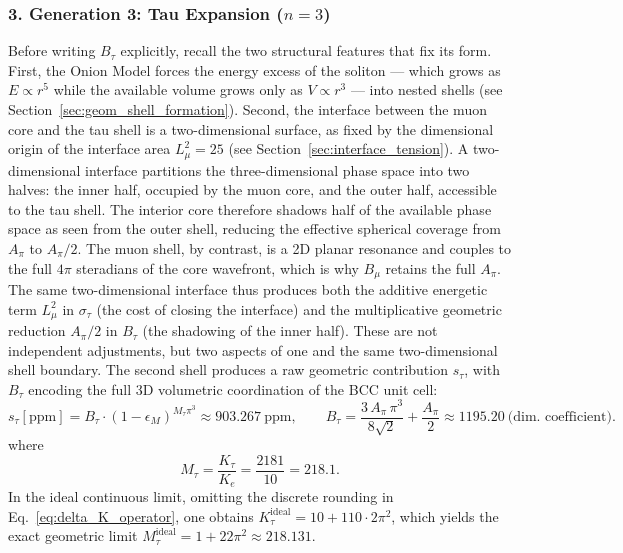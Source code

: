 \documentclass[10pt,a4paper]{article}
\begin{document}
\subsubsection*{3. Generation 3: Tau Expansion ($n=3$)}
Before writing $B_\tau$ explicitly, recall the two structural features
that fix its form. First, the Onion Model forces the energy excess of
the soliton --- which grows as $E \propto r^5$ while the available
volume grows only as $V \propto r^3$ --- into nested shells (see
Section~\ref{sec:geom_shell_formation}). Second, the interface between
the muon core and the tau shell is a two-dimensional surface, as fixed
by the dimensional origin of the interface area $L_\mu^2 = 25$ (see
Section~\ref{sec:interface_tension}). A two-dimensional interface
partitions the three-dimensional phase space into two halves: the inner
half, occupied by the muon core, and the outer half, accessible to the
tau shell. The interior core therefore shadows half of the available
phase space as seen from the outer shell, reducing the effective
spherical coverage from $A_\pi$ to $A_\pi/2$. The muon shell, by
contrast, is a 2D planar resonance and couples to the full $4\pi$
steradians of the core wavefront, which is why $B_\mu$ retains the full
$A_\pi$. The same two-dimensional interface thus produces both the
additive energetic term $L_\mu^2$ in $\sigma_\tau$ (the cost of closing
the interface) and the multiplicative geometric reduction $A_\pi/2$ in
$B_\tau$ (the shadowing of the inner half). These are not independent
adjustments, but two aspects of one and the same two-dimensional shell
boundary.
The second shell produces a raw geometric contribution $s_\tau$, with $B_\tau$
encoding the full 3D volumetric coordination of the BCC unit cell:
\begin{equation}
	s_{\tau}[\text{ppm}]
	= B_{\tau}\cdot(1-\epsilon_M)^{M_{\tau}\pi^{3}}
	\approx 903.267\ \text{ppm},
	\qquad
	B_{\tau} = \frac{3\,A_{\pi}\,\pi^{3}}{8\sqrt{2}} + \frac{A_{\pi}}{2}
	\approx 1195.20\ \text{(dim. coefficient)}.
	\label{eq:s_tau}
\end{equation}
where
\begin{equation}
	M_{\tau}
	= \frac{K_{\tau}}{K_e}
	= \frac{2181}{10}
	= 218.1.
\end{equation}
In the ideal continuous limit, omitting the discrete rounding in Eq.~\eqref{eq:delta_K_operator},
one obtains $K_{\tau}^{\text{ideal}} = 10 + 110 \cdot 2\pi^{2}$, which yields the exact geometric limit
$M_{\tau}^{\text{ideal}} = 1 + 22\pi^{2} \approx 218.131$.
\end{document}
